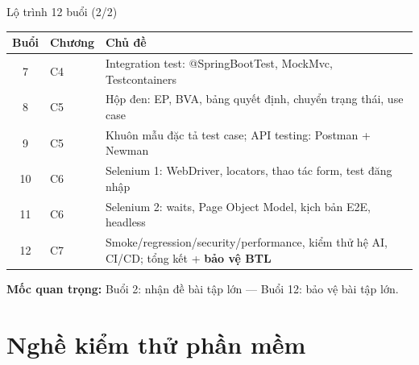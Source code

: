 \documentclass[aspectratio=169,12pt]{beamer}
\begin{document}
\begin{frame}{Lộ trình 12 buổi (2/2)}
  \begin{center}
  \footnotesize
  \begin{tabular}{cl>{\raggedright\arraybackslash}p{8.6cm}}
    \toprule
    \textbf{Buổi} & \textbf{Chương} & \textbf{Chủ đề} \\
    \midrule
    7  & C4 & Integration test: @SpringBootTest, MockMvc, Testcontainers \\
    8  & C5 & Hộp đen: EP, BVA, bảng quyết định, chuyển trạng thái, use case \\
    9  & C5 & Khuôn mẫu đặc tả test case; API testing: Postman + Newman \\
    10 & C6 & Selenium 1: WebDriver, locators, thao tác form, test đăng nhập \\
    11 & C6 & Selenium 2: waits, Page Object Model, kịch bản E2E, headless \\
    12 & C7 & Smoke/regression/security/performance, kiểm thử hệ AI, CI/CD;
             tổng kết + \textbf{bảo vệ BTL} \\
    \bottomrule
  \end{tabular}
  \end{center}

  \vspace{0.2em}
  {\small \textbf{Mốc quan trọng:} Buổi 2: nhận đề bài tập lớn ---
  Buổi 12: bảo vệ bài tập lớn.}
\end{frame}

\section{Nghề kiểm thử phần mềm}
\end{document}
